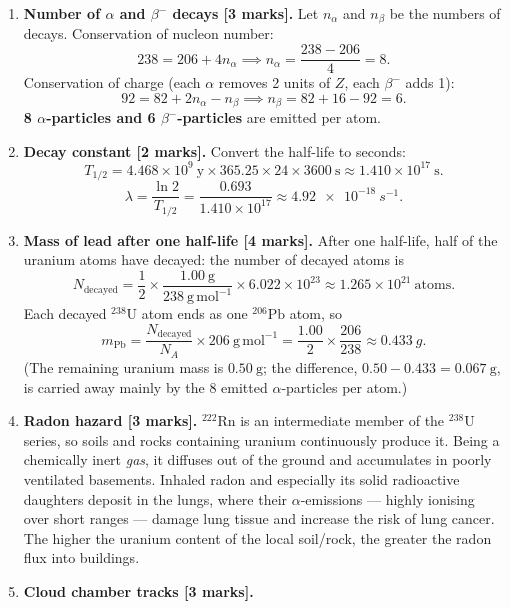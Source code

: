 \documentclass[11pt]{article}
\begin{document}
\begin{corrige}
\begin{enumerate}
    \item \textbf{Number of $\alpha$ and $\beta^{-}$ decays [3 marks].} Let $n_\alpha$ and $n_\beta$ be the numbers of decays. Conservation of nucleon number:
    \[238 = 206 + 4n_\alpha \implies n_\alpha = \frac{238 - 206}{4} = 8.\]
    Conservation of charge (each $\alpha$ removes 2 units of $Z$, each $\beta^{-}$ adds 1):
    \[92 = 82 + 2n_\alpha - n_\beta \implies n_\beta = 82 + 16 - 92 = 6.\]
    \textbf{8 $\alpha$-particles and 6 $\beta^{-}$-particles} are emitted per atom.
    \item \textbf{Decay constant [2 marks].} Convert the half-life to seconds:
    \[T_{1/2} = 4.468\times10^{9}\ \mathrm{y} \times 365.25 \times 24 \times 3600\ \mathrm{s} \approx 1.410\times10^{17}\ \mathrm{s}.\]
    \[\lambda = \frac{\ln 2}{T_{1/2}} = \frac{0.693}{1.410\times10^{17}} \approx \SI{4.92e-18}{s^{-1}}.\]
    \item \textbf{Mass of lead after one half-life [4 marks].} After one half-life, half of the uranium atoms have decayed: the number of decayed atoms is
    \[N_{\text{decayed}} = \frac{1}{2}\times\frac{1.00\ \mathrm{g}}{238\ \mathrm{g\,mol^{-1}}}\times 6.022\times10^{23} \approx 1.265\times10^{21}\ \text{atoms}.\]
    Each decayed $^{238}\mathrm{U}$ atom ends as one $^{206}\mathrm{Pb}$ atom, so
    \[m_{\text{Pb}} = \frac{N_{\text{decayed}}}{N_A}\times 206\ \mathrm{g\,mol^{-1}} = \frac{1.00}{2}\times\frac{206}{238} \approx \SI{0.433}{g}.\]
    (The remaining uranium mass is $0.50\ \mathrm{g}$; the difference, $0.50 - 0.433 = 0.067\ \mathrm{g}$, is carried away mainly by the 8 emitted $\alpha$-particles per atom.)
    \item \textbf{Radon hazard [3 marks].} $^{222}\mathrm{Rn}$ is an intermediate member of the $^{238}\mathrm{U}$ series, so soils and rocks containing uranium continuously produce it. Being a chemically inert \emph{gas}, it diffuses out of the ground and accumulates in poorly ventilated basements. Inhaled radon and especially its solid radioactive daughters deposit in the lungs, where their $\alpha$-emissions — highly ionising over short ranges — damage lung tissue and increase the risk of lung cancer. The higher the uranium content of the local soil/rock, the greater the radon flux into buildings.
    \item \textbf{Cloud chamber tracks [3 marks].}
    \begin{itemize}

\end{itemize}
\end{enumerate}
\end{corrige}
\end{document}
